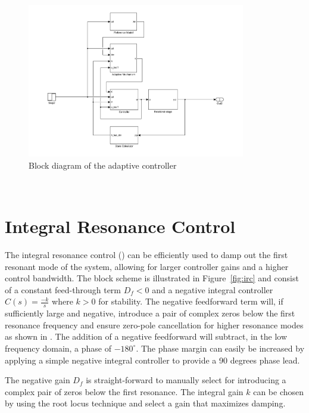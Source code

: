 \begin{figure}[h]
  \centering %
  \includegraphics[width=0.85\textwidth, trim=5cm 0cm 3.8cm 0cm, clip=true]{fig/matlab/adaptive_scheme}
  \caption{\label{fig:adaptive}Block diagram of the adaptive controller}
\end{figure}

\newpage~\newpage~
\FloatBarrier
\section{Integral Resonance Control}\label{sec:irc}
The integral resonance control (\abbrIRC) can be efficiently used to damp out the first resonant mode of the system, allowing for larger controller gains and a higher control bandwidth. The \abbrIRC block scheme is illustrated in Figure~\ref{fig:irc} and consist of a constant feed-through term $D_f<0$ and a negative integral controller $C(s)=\frac{-k}{s}$ where $k>0$ for stability. The negative feedforward term will, if sufficiently large and negative, introduce a pair of complex zeros below the first resonance frequency and ensure zero-pole cancellation for higher resonance modes as shown in \citep{Aphale:2007}. The addition of a negative feedforward will subtract, in the low frequency domain, a phase of $-180^{\circ}$. The phase margin can easily be increased by applying a simple negative integral controller to provide a 90 degrees phase lead.

The negative gain $D_f$ is straight-forward to manually select for introducing a complex pair of zeros below the first resonance. The integral gain $k$ can be chosen by using the root locus technique and select a gain that maximizes damping.

